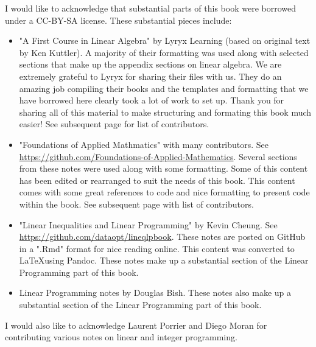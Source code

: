 \documentclass[letter,12pt]{book}
\renewcommand{\0}{\mathbf{0}}
\begin{document}
I would like to acknowledge that substantial parts of this book were borrowed under a CC-BY-SA license.   These substantial pieces include:
\begin{itemize}
\item "A First Course in Linear Algebra" by Lyryx Learning (based on original text by Ken Kuttler).   A majority of their formatting was used along with selected sections that make up the appendix sections on linear algebra. We are extremely grateful to Lyryx for sharing their files with us.  They do an amazing job compiling their books and the templates and formatting that we have borrowed here clearly took a lot of work to set up.  Thank you for sharing all of this material to make structuring and formating this book much easier! See subsequent page for list of contributors.
\item "Foundations of Applied Mathmatics" with many contributors.  See \url{https://github.com/Foundations-of-Applied-Mathematics}.  Several sections from these notes were used along with some formatting.  Some of this content has been edited or rearranged to suit the needs of this book.  This content comes with some great references to code and nice formatting to present code within the book.   See subsequent page with list of contributors.
\item "Linear Inequalities and Linear Programming" by 
Kevin Cheung.  See \url{https://github.com/dataopt/lineqlpbook}.  These notes are posted on GitHub in a ".Rmd" format for nice reading online.  This content was converted to \LaTeX using Pandoc.    These notes make up a substantial section of the Linear Programming part of this book.
\item Linear Programming notes by Douglas Bish.  These notes also make up a substantial section of the Linear Programming part of this book.
\end{itemize}

I would also like to acknowledge Laurent Porrier and Diego Moran for contributing various notes on linear and integer programming. 



	\cleardoublepage


	\setlength{\parskip}{3.5pt} %
	\tableofcontents
	\cleardoublepage
	
\end{document}
